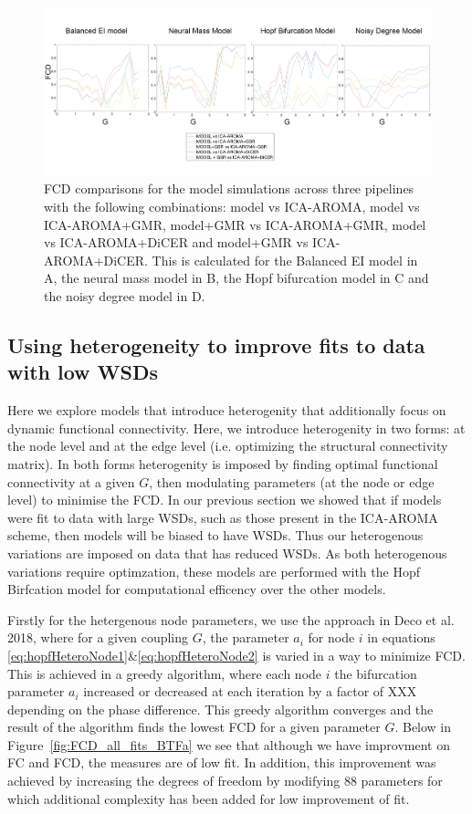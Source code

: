 \documentclass[oneside]{zHenriquesLab-StyleBioRxiv}
\begin{document}
\begin{figure}[ht!]
\includegraphics[width=1\textwidth]{figs/FCD_all.png}
\caption{FCD comparisons for the model simulations across three pipelines with the following combinations: model vs ICA-AROMA, model vs ICA-AROMA+GMR, model+GMR vs ICA-AROMA+GMR, model vs ICA-AROMA+DiCER and model+GMR vs ICA-AROMA+DiCER. This is calculated for the Balanced EI model in A, the neural mass model in B, the Hopf bifurcation model in C and the noisy degree model in D.}\label{fig:FCD_all_fits}
\end{figure}


\subsection*{Using heterogeneity to improve fits to data with low WSDs}
Here we explore models that introduce heterogenity that additionally focus on dynamic functional connectivity. Here, we introduce heterogenity in two forms: at the node level and at the edge level (i.e. optimizing the structural connectivity matrix). In both forms heterogenity is imposed by finding optimal functional connectivity at a given $G$, then modulating parameters (at the node or edge level) to minimise the FCD. In our previous section we showed that if models were fit to data with large WSDs, such as those present in the ICA-AROMA scheme, then models will be biased to have WSDs. Thus our heterogenous variations are imposed on data that has reduced WSDs. As both heterogenous variations require optimzation, these models are performed with the Hopf Birfcation model for computational efficency over the other models.

Firstly for the hetergenous node parameters, we use the approach in Deco et al. 2018, where for a given coupling $G$, the parameter $a_i$ for node $i$ in equations \ref{eq:hopfHeteroNode1}\&\ref{eq:hopfHeteroNode2} is varied in a way to minimize FCD. This is achieved in a greedy algorithm, where each node $i$ the bifurcation parameter $a_i$ increased or decreased at each iteration by a factor of XXX depending on the phase difference. This greedy algorithm converges and the result of the algorithm finds the lowest FCD for a given parameter $G$. Below in Figure~\ref{fig:FCD_all_fits_BTFa} we see that although we have improvment on FC and FCD, the measures are of low fit. In addition, this improvement was achieved by increasing the degrees of freedom by modifying $88$ parameters for which additional complexity has been added for low improvement of fit.
\end{document}
